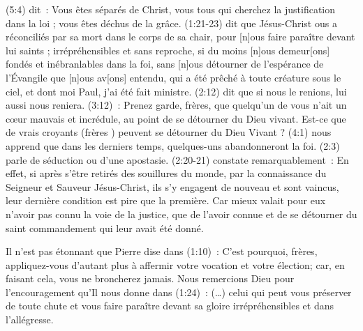 \begin{enumerate}
\begin{specialpar}{}
(5:4) dit~: \og Vous êtes séparés de Christ,
 vous tous qui cherchez la justification dans la loi ;
 vous êtes déchus de la grâce. \fg{}
 \BRallowhypbch{}(1:21-23)\BRforbidhypbch{} dit que Jésus-Christ
 \og [n]ous a réconciliés par sa mort dans le corps de sa chair,
 pour [n]ous faire paraître devant lui saints ; irrépréhensibles et sans reproche,
 si du moins [n]ous demeur[ons] fondés et inébranlables dans la foi,
 sans [n]ous détourner de l'espérance de l'Évangile que [n]ous av[ons] entendu,
 qui a été prêché à toute créature sous le ciel, et dont moi Paul, j'ai été fait ministre. \fg{}
 (2:12) dit que \og si nous le renions, lui aussi nous reniera. \fg{}
 (3:12)~: \og Prenez garde, frères, que quelqu'un de vous n'ait un cœur mauvais
 et incrédule, au point de se détourner du Dieu vivant. \fg{}
 Est-ce que de vrais croyants (\og frères \fg{}) peuvent se détourner du Dieu Vivant ?
 (4:1) nous apprend que \og dans les derniers temps, quelques-uns abandonneront la foi. \fg{}
 (2:3) parle de \og séduction \fg{} ou d'une apostasie.
 (2:20-21) constate remarquablement~: \og En effet, si après s'être retirés
 des souillures du monde, par la connaissance du Seigneur et Sauveur Jésus-Christ,
 ils s'y engagent de nouveau et sont vaincus, leur dernière condition est pire que la première.
 Car mieux valait pour eux n'avoir pas connu la voie de la justice,
 que de l'avoir connue et de se détourner du saint commandement  qui leur avait été donné. \fg{}
\end{specialpar}

\begin{specialpar}{}
Il n'est pas étonnant que Pierre dise dans (1:10)~:
 \og C'est pourquoi, frères, appliquez-vous d'autant plus à affermir
 votre vocation et votre élection;
 car, en faisant cela, vous ne broncherez jamais. \fg{}
Nous remercions Dieu pour l'encouragement qu'Il nous donne dans (1:24)~:
 \og (\dots{}) celui qui peut vous préserver de toute chute et vous faire paraître
 devant sa gloire irrépréhensibles et dans l'allégresse. \fg{}
\end{specialpar}


\end{enumerate}
